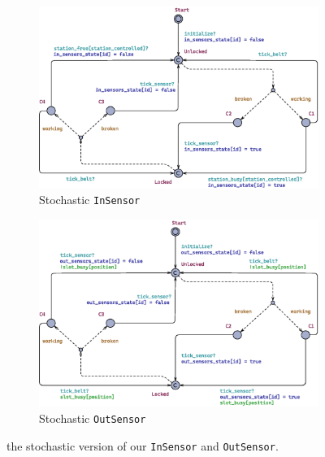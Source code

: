 \documentclass[a4paper,twoside]{article}
\begin{document}
    \begin{figure}[h!]
        \begin{subfigure}{0.49\linewidth}
            \includegraphics[width=\textwidth]{images/automata/in_sensor_s}
            \caption{Stochastic \texttt{InSensor}}
        \end{subfigure}
        \begin{subfigure}{0.49\linewidth}
            \includegraphics[width=\textwidth]{images/automata/out_sensor_s}
            \caption{Stochastic \texttt{OutSensor}}
        \end{subfigure}
        \caption{the stochastic version of our \texttt{InSensor} and \texttt{OutSensor}.}
        \label{figure:stochastic_sensors}
    \end{figure}
\end{document}

